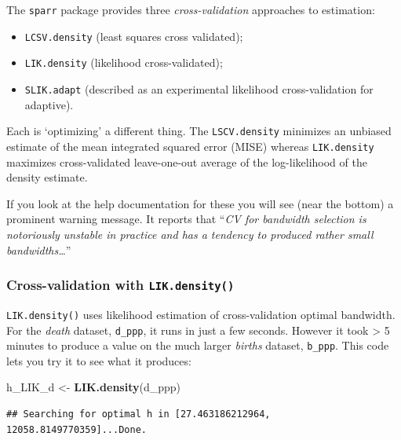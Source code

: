 \documentclass[
]{book}
\newenvironment{Shaded}{\begin{snugshade}}{\end{snugshade}}
\newcommand{\FunctionTok}[1]{\textcolor[rgb]{0.13,0.29,0.53}{\textbf{#1}}}
\newcommand{\NormalTok}[1]{#1}
\newcommand{\OtherTok}[1]{\textcolor[rgb]{0.56,0.35,0.01}{#1}}
\providecommand{\tightlist}{%
  \setlength{\itemsep}{0pt}\setlength{\parskip}{0pt}}
\newenvironment{rmdnote}[1]
  {
  \begin{itemize}
  \renewcommand{\labelitemi}{
    \raisebox{-.7\height}[0pt][0pt]{
      {\setkeys{Gin}{width=3em,keepaspectratio}\texttt{[image: images/\#1]}}
    }
  }
  \setlength{\fboxsep}{1em}
  \begin{note}
  \item
  }
  {
  \end{note}
  \end{itemize}
  }
\begin{document}
\begin{rmdnote}{note}
The \texttt{sparr} package provides three \emph{cross-validation} approaches to estimation:

\begin{itemize}
\tightlist
\item
  \texttt{LCSV.density} (least squares cross validated);
\item
  \texttt{LIK.density} (likelihood cross-validated);
\item
  \texttt{SLIK.adapt} (described as an experimental likelihood cross-validation for adaptive).
\end{itemize}

Each is `optimizing' a different thing. The \texttt{LSCV.density} minimizes an unbiased estimate of the mean integrated squared error (MISE) whereas \texttt{LIK.density} maximizes cross-validated leave-one-out average of the log-likelihood of the density estimate.

If you look at the help documentation for these you will see (near the bottom) a prominent warning message. It reports that ``\emph{CV for bandwidth selection is notoriously unstable in practice and has a tendency to produced rather small bandwidths\ldots{}}''

\end{rmdnote}

\hypertarget{cross-validation-with-lik.density}{%
\subsubsection{\texorpdfstring{Cross-validation with \texttt{LIK.density()}}{Cross-validation with LIK.density()}}\label{cross-validation-with-lik.density}}

\texttt{LIK.density()} uses likelihood estimation of cross-validation optimal bandwidth. For the \emph{death} dataset, \texttt{d\_ppp}, it runs in just a few seconds. However it took \textgreater{} 5 minutes to produce a value on the much larger \emph{births} dataset, \texttt{b\_ppp}. This code lets you try it to see what it produces:

\begin{Shaded}
\begin{Highlighting}[]
\NormalTok{h\_LIK\_d }\OtherTok{\textless{}{-}} \FunctionTok{LIK.density}\NormalTok{(d\_ppp)}
\end{Highlighting}
\end{Shaded}

\begin{verbatim}
## Searching for optimal h in [27.463186212964, 12058.8149770359]...Done.
\end{verbatim}
\end{document}
